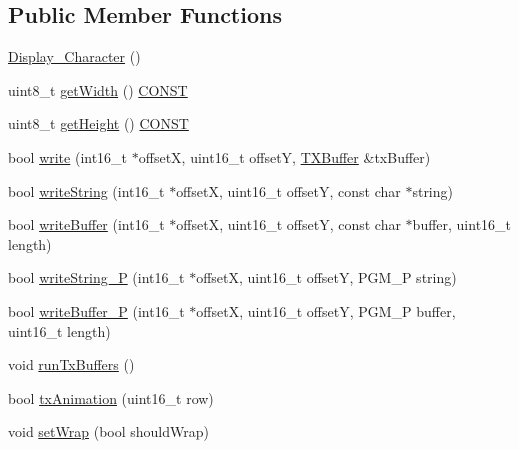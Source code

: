 \subsection*{Public Member Functions}
\begin{DoxyCompactItemize}
\item 
\hyperlink{classmhvlib_1_1_display___character_adc84df1de3ee7731c0d487cff890c6fd}{Display\-\_\-\-Character} ()
\item 
uint8\-\_\-t \hyperlink{classmhvlib_1_1_display___character_a5bdec4055085c5023b35e70ffab032fd}{get\-Width} () \hyperlink{io_8h_a0c33b494a68ce28497e7ce8e5e95feff}{C\-O\-N\-S\-T}
\item 
uint8\-\_\-t \hyperlink{classmhvlib_1_1_display___character_ae64e651272eff783000051354c0af7cf}{get\-Height} () \hyperlink{io_8h_a0c33b494a68ce28497e7ce8e5e95feff}{C\-O\-N\-S\-T}
\item 
bool \hyperlink{classmhvlib_1_1_display___character_ab81171f8d0c6ad80aeba80c826d7972d}{write} (int16\-\_\-t $\ast$offset\-X, uint16\-\_\-t offset\-Y, \hyperlink{classmhvlib_1_1_t_x_buffer}{T\-X\-Buffer} \&tx\-Buffer)
\item 
bool \hyperlink{classmhvlib_1_1_display___character_a8a2d3fd24d5cb24dcb3958100008eaf0}{write\-String} (int16\-\_\-t $\ast$offset\-X, uint16\-\_\-t offset\-Y, const char $\ast$string)
\item 
bool \hyperlink{classmhvlib_1_1_display___character_a35f6e2155528fc0a904b77bf0cf8393a}{write\-Buffer} (int16\-\_\-t $\ast$offset\-X, uint16\-\_\-t offset\-Y, const char $\ast$buffer, uint16\-\_\-t length)
\item 
bool \hyperlink{classmhvlib_1_1_display___character_aa90f6bf0f3061d57ceb19c45fa53bbc4}{write\-String\-\_\-\-P} (int16\-\_\-t $\ast$offset\-X, uint16\-\_\-t offset\-Y, P\-G\-M\-\_\-\-P string)
\item 
bool \hyperlink{classmhvlib_1_1_display___character_a2dbf95a78674f4e061c45a25e876beaa}{write\-Buffer\-\_\-\-P} (int16\-\_\-t $\ast$offset\-X, uint16\-\_\-t offset\-Y, P\-G\-M\-\_\-\-P buffer, uint16\-\_\-t length)
\item 
void \hyperlink{classmhvlib_1_1_display___character_a03674a7c620545467b71b137b24fbc5c}{run\-Tx\-Buffers} ()
\item 
bool \hyperlink{classmhvlib_1_1_display___character_ab889b4aa2988f57ed87cef539d1221f9}{tx\-Animation} (uint16\-\_\-t row)
\item 
void \hyperlink{classmhvlib_1_1_display___character_acb01612ec8f5d46d318903b8e1e72440}{set\-Wrap} (bool should\-Wrap)

\end{DoxyCompactItemize}
